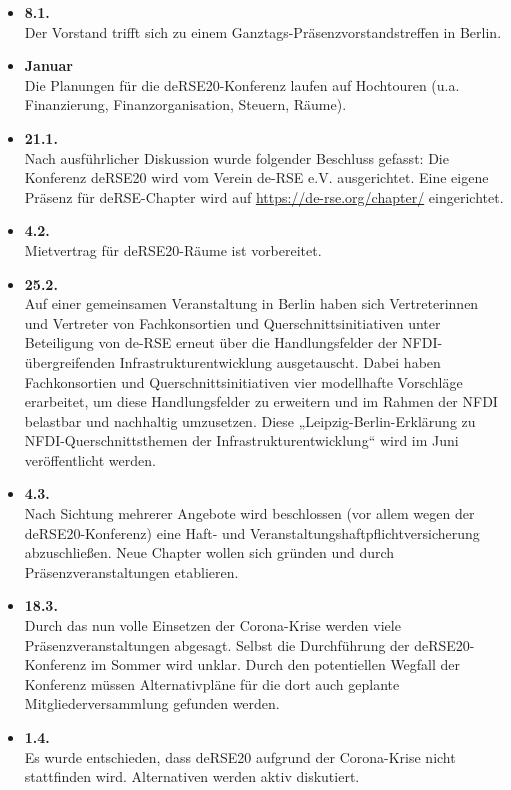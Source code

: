 \begin{itemize}
 \item \textbf{8.1.}\\Der Vorstand trifft sich zu einem Ganztags-Präsenzvorstandstreffen in Berlin.
 \item \textbf{Januar}\\Die Planungen für die deRSE20-Konferenz laufen auf Hochtouren (u.a. Finanzierung, Finanzorganisation, Steuern, Räume).
 \item \textbf{21.1.}\\Nach ausführlicher Diskussion wurde folgender Beschluss gefasst: Die Konferenz deRSE20 wird vom Verein de-RSE e.V. ausgerichtet.
 Eine eigene Präsenz für deRSE-Chapter wird auf \href{https://de-rse.org/chapter/}{https://de-rse.org/chapter/} eingerichtet.
 \item \textbf{4.2.}\\Mietvertrag für deRSE20-Räume ist vorbereitet.
 \item \textbf{25.2.}\\Auf einer gemeinsamen Veranstaltung in Berlin haben sich Vertreterinnen und Vertreter von Fachkonsortien und Querschnittsinitiativen unter Beteiligung von de-RSE erneut über die Handlungsfelder der NFDI-übergreifenden Infrastrukturentwicklung ausgetauscht. Dabei haben Fachkonsortien und Querschnittsinitiativen vier modellhafte Vorschläge erarbeitet, um diese Handlungsfelder zu erweitern und im Rahmen der NFDI belastbar und nachhaltig umzusetzen. Diese „Leipzig-Berlin-Erklärung zu NFDI-Querschnittsthemen der Infrastrukturentwicklung“ wird im Juni veröffentlicht werden.
 \item \textbf{4.3.}\\Nach Sichtung mehrerer Angebote wird beschlossen (vor allem wegen der deRSE20-Konferenz) eine Haft- und Veranstaltungshaftpflichtversicherung abzuschließen. Neue Chapter wollen sich gründen und durch Präsenzveranstaltungen etablieren.
 \item \textbf{18.3.}\\Durch das nun volle Einsetzen der Corona-Krise werden viele Präsenzveranstaltungen abgesagt. Selbst die Durchführung der deRSE20-Konferenz im Sommer wird unklar. Durch den potentiellen Wegfall der Konferenz müssen Alternativpläne für die dort auch geplante Mitgliederversammlung gefunden werden.
 \item \textbf{1.4.}\\Es wurde entschieden, dass deRSE20 aufgrund der Corona-Krise nicht stattfinden wird. Alternativen werden aktiv diskutiert.

\end{itemize}
